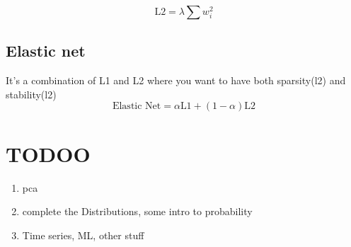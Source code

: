 \documentclass[12pt]{extarticle}
\begin{document}
$$ \text{L2} = \lambda \sum w_i^2 $$

\subsection{Elastic net}
It's a combination of L1 and L2 where you want to have both sparsity(l2) 
and stability(l2)
$$ \text{Elastic Net} = \alpha \text{L1} + (1-\alpha)\text{L2} $$



\section{TODOO}
\begin{enumerate}
    \item pca
    \item complete the Distributions, some intro to probability
    \item Time series, ML, other stuff

\end{enumerate}
\end{document}

